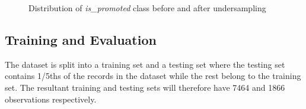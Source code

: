 \documentclass[runningheads]{llncs}
\begin{document}
\begin{figure}
\centering


\caption{Distribution of \emph{is\_promoted} class before and after
undersampling}

\label{fig:class_balancing}

\end{figure}

\hypertarget{training-and-evaluation}{%
\subsection{Training and Evaluation}\label{training-and-evaluation}}

The dataset is split into a training set and a testing set where the
testing set contains 1/5ths of the records in the dataset while the rest
belong to the training set. The resultant training and testing sets will
therefore have 7464 and 1866 observations respectively.
\end{document}
